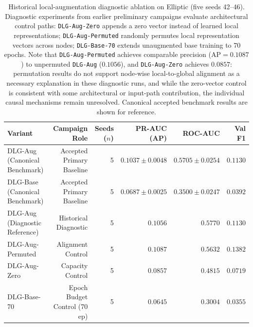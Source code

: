 \documentclass[applsci,article,submit,moreauthors,pdftex]{Definitions/mdpi}
\begin{document}
\begin{table}[H]
\centering\footnotesize\setlength{\tabcolsep}{6pt}
\caption{Historical local-augmentation diagnostic ablation on Elliptic (five seeds 42--46). Diagnostic experiments from earlier preliminary campaigns evaluate architectural control paths: \texttt{DLG-Aug-Zero} appends a zero vector instead of learned local representations; \texttt{DLG-Aug-Permuted} randomly permutes local representation vectors across nodes; \texttt{DLG-Base-70} extends unaugmented base training to 70 epochs. Note that \texttt{DLG-Aug-Permuted} achieves comparable precision ($\mathrm{AP}=0.1087$) to unpermuted \texttt{DLG-Aug} ($0.1056$), and \texttt{DLG-Aug-Zero} achieves $0.0857$: permutation results do not support node-wise local-to-global alignment as a necessary explanation in these diagnostic runs, and while the zero-vector control is consistent with some architectural or input-path contribution, the individual causal mechanisms remain unresolved. Canonical accepted benchmark results are shown for reference.}
\label{tab:app_ablation_elliptic}
\begin{tabular}{lrrrrr}\toprule
\textbf{Variant} & \textbf{Campaign Role} & \textbf{Seeds ($n$)} & \textbf{PR-AUC (AP)} & \textbf{ROC-AUC} & \textbf{Val F1} \\\midrule
DLG-Aug (Canonical Benchmark) & Accepted Primary Baseline & 5 & $0.1037 \pm 0.0048$ & $0.5705 \pm 0.0254$ & $0.1130$ \\
DLG-Base (Canonical Benchmark) & Accepted Primary Baseline & 5 & $0.0687 \pm 0.0025$ & $0.3500 \pm 0.0247$ & $0.0392$ \\\midrule
DLG-Aug (Diagnostic Reference) & Historical Diagnostic & 5 & $0.1056$ & $0.5770$ & $0.1130$ \\
DLG-Aug-Permuted & Alignment Control & 5 & $\mathbf{0.1087}$ & $0.5632$ & $0.1382$ \\
DLG-Aug-Zero & Capacity Control & 5 & $0.0857$ & $0.4815$ & $0.0719$ \\
DLG-Base-70 & Epoch Budget Control (70 ep) & 5 & $0.0645$ & $0.3004$ & $0.0355$ \\\bottomrule
\end{tabular}
\end{table}
\end{document}
